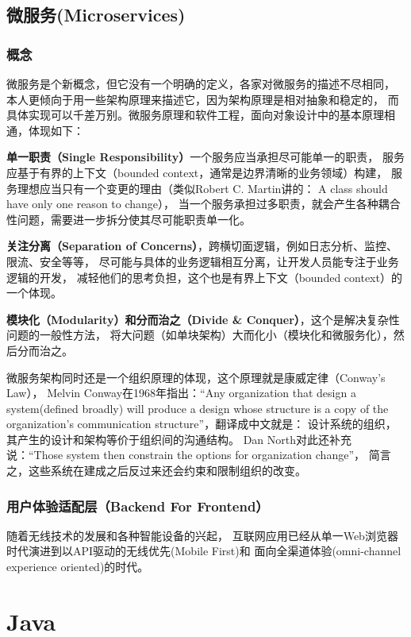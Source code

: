\documentclass{book}
\begin{document}
\section{微服务(Microservices)}

\subsection{概念}

微服务是个新概念，但它没有一个明确的定义，各家对微服务的描述不尽相同，
本人更倾向于用一些架构原理来描述它，因为架构原理是相对抽象和稳定的，
而具体实现可以千差万别。微服务原理和软件工程，面向对象设计中的基本原理相通，体现如下：

\textbf{单一职责（Single Responsibility）}一个服务应当承担尽可能单一的职责，
服务应基于有界的上下文（bounded context，通常是边界清晰的业务领域）构建，
服务理想应当只有一个变更的理由（类似Robert C. Martin讲的：
A class should have only one reason to change），
当一个服务承担过多职责，就会产生各种耦合性问题，需要进一步拆分使其尽可能职责单一化。

\textbf{关注分离（Separation of Concerns）}，跨横切面逻辑，例如日志分析、监控、限流、安全等等，
尽可能与具体的业务逻辑相互分离，让开发人员能专注于业务逻辑的开发，
减轻他们的思考负担，这个也是有界上下文（bounded context）的一个体现。

\textbf{模块化（Modularity）和分而治之（Divide \& Conquer）}，这个是解决复杂性问题的一般性方法，
将大问题（如单块架构）大而化小（模块化和微服务化），然后分而治之。

微服务架构同时还是一个组织原理的体现，这个原理就是康威定律（Conway’s Law），
Melvin Conway在1968年指出：“Any organization that design a 
system(defined broadly) will produce a design whose structure is a copy of the organization’s communication structure”，翻译成中文就是：
设计系统的组织，其产生的设计和架构等价于组织间的沟通结构。
Dan North对此还补充说：“Those system then constrain the options for organization change”，
简言之，这些系统在建成之后反过来还会约束和限制组织的改变。

\subsection{用户体验适配层（Backend For Frontend）}

随着无线技术的发展和各种智能设备的兴起，
互联网应用已经从单一Web浏览器时代演进到以API驱动的无线优先(Mobile First)和
面向全渠道体验(omni-channel experience oriented)的时代。

\chapter{Java}
\end{document}

